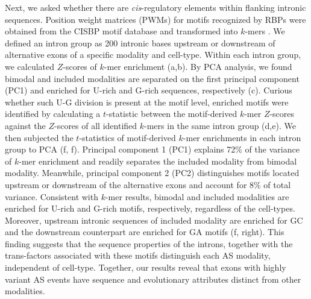 Next, we asked whether there are \emph{cis}-regulatory elements within flanking intronic sequences. Position weight matrices (PWMs) for motifs recognized by RBPs were obtained from the CISBP motif database \cite{Ray:2013br} and transformed into $k$-mers \cite{Xu:2010bi}. We defined an intron group as 200 intronic bases upstream or downstream of alternative exons of a specific modality and cell-type. Within each intron group, we calculated $Z$-scores of $k$-mer enrichment (a,b). By PCA analysis, we found bimodal and included modalities are separated on the first principal component (PC1) and enriched for U-rich and G-rich sequences, respectively (c). Curious whether such U-G division is present at the motif level, enriched motifs were identified by calculating a $t$-statistic between the motif-derived $k$-mer $Z$-scores against the $Z$-scores of all identified $k$-mers in the same intron group (d,e). We then subjected the $t$-statistics of motif-derived $k$-mer enrichments in each intron group to PCA (f, f). Principal component 1 (PC1) explains 72\% of the variance of $k$-mer enrichment and readily separates the included modality from bimodal modality. Meanwhile, principal component 2 (PC2) distinguishes motifs located upstream or downstream of the alternative exons and account for 8\% of total variance. Consistent with $k$-mer results, bimodal and included modalities are enriched for U-rich and G-rich motifs, respectively, regardless of the cell-types. Moreover, upstream intronic sequences of included modality are enriched for GC and the downstream counterpart are enriched for GA motifs (f, right). This finding suggests that the sequence properties of the introns, together with the trans-factors associated with these motifs distinguish each AS modality, independent of cell-type. Together, our results reveal that exons with highly variant AS events have sequence and evolutionary attributes distinct from other modalities.




